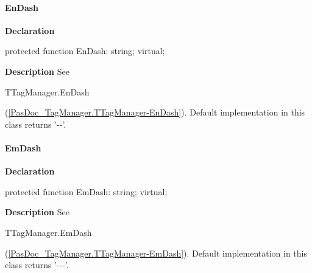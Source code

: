 \documentclass{report}
\newif\ifpdf
\begin{document}
\paragraph*{EnDash}\hspace*{\fill}

\label{PasDoc_Gen.TDocGenerator-EnDash}
\begin{list}{}{
\setlength{\itemindent}{0cm}
\setlength{\listparindent}{0cm}
\setlength{\leftmargin}{\evensidemargin}
\addtolength{\leftmargin}{\tmplength}
\settowidth{\labelsep}{X}
\addtolength{\leftmargin}{\labelsep}
\setlength{\labelwidth}{\tmplength}
}
\item[\textbf{Declaration}\hfill]
\ifpdf
\begin{flushleft}
\fi
\begin{ttfamily}
protected function EnDash: string; virtual;\end{ttfamily}

\ifpdf
\end{flushleft}
\fi

\par
\item[\textbf{Description}]
See \begin{ttfamily}TTagManager.EnDash\end{ttfamily}(\ref{PasDoc_TagManager.TTagManager-EnDash}). Default implementation in this class returns '{-}{-}'.

\end{list}
\paragraph*{EmDash}\hspace*{\fill}

\label{PasDoc_Gen.TDocGenerator-EmDash}
\begin{list}{}{
\setlength{\itemindent}{0cm}
\setlength{\listparindent}{0cm}
\setlength{\leftmargin}{\evensidemargin}
\addtolength{\leftmargin}{\tmplength}
\settowidth{\labelsep}{X}
\addtolength{\leftmargin}{\labelsep}
\setlength{\labelwidth}{\tmplength}
}
\item[\textbf{Declaration}\hfill]
\ifpdf
\begin{flushleft}
\fi
\begin{ttfamily}
protected function EmDash: string; virtual;\end{ttfamily}

\ifpdf
\end{flushleft}
\fi

\par
\item[\textbf{Description}]
See \begin{ttfamily}TTagManager.EmDash\end{ttfamily}(\ref{PasDoc_TagManager.TTagManager-EmDash}). Default implementation in this class returns '{-}{-}{-}'.

\end{list}
\end{document}

